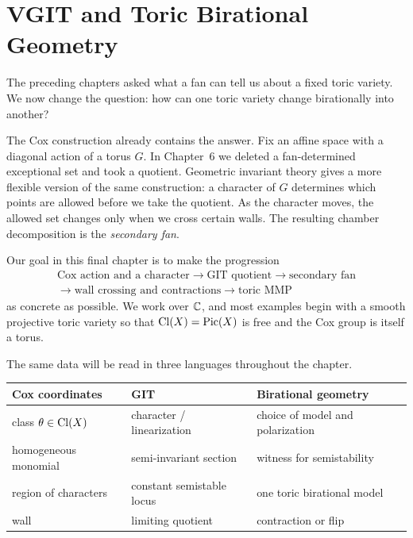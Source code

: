 \chapter[VGIT and Toric Birational Geometry]
{VGIT and Toric Birational\\ Geometry}
\label{chap:vgit-toric-birational}

\begin{chapteroverview}
The preceding chapters asked what a fan can tell us about a fixed toric
variety.  We now change the question: how can one toric variety change
birationally into another?

The Cox construction already contains the answer.  Fix an affine space
with a diagonal action of a torus \(G\).  In Chapter~6 we deleted a
fan-determined exceptional set and took a quotient.  Geometric invariant
theory gives a more flexible version of the same construction: a
character of \(G\) determines which points are allowed before we take the
quotient.  As the character moves, the allowed set changes only when we
cross certain walls.  The resulting chamber decomposition is the
\emph{secondary fan}.

Our goal in this final chapter is to make the progression
\[
\boxed{
\begin{gathered}
\text{Cox action and a character}
\longrightarrow
\text{GIT quotient}
\longrightarrow
\text{secondary fan}
\\[-1mm]
\longrightarrow
\text{wall crossing and contractions}
\longrightarrow
\text{toric MMP}
\end{gathered}}
\]
as concrete as possible.  We work over \(\mathbb{C}\), and most examples begin
with a smooth projective toric variety so that
\(\operatorname{Cl}(X)=\operatorname{Pic}(X)\) is free and the Cox group is itself a torus.
\end{chapteroverview}

\begin{threedictionaries}
The same data will be read in three languages throughout the chapter.

\medskip

\begin{center}
\small
\begin{tabularx}{\linewidth}{@{}
  >{\raggedright\arraybackslash}X
  >{\raggedright\arraybackslash}X
  >{\raggedright\arraybackslash}X@{}}
\toprule
\textbf{Cox coordinates}
&
\textbf{GIT}
&
\textbf{Birational geometry}
\\
\midrule
class \(\theta\in\operatorname{Cl}(X)\)
& character / linearization
& choice of model and polarization
\\
homogeneous monomial
& semi-invariant section
& witness for semistability
\\
region of characters
& constant semistable locus
& one toric birational model
\\
wall
& limiting quotient
& contraction or flip
\\
\bottomrule
\end{tabularx}
\end{center}
\end{threedictionaries}

